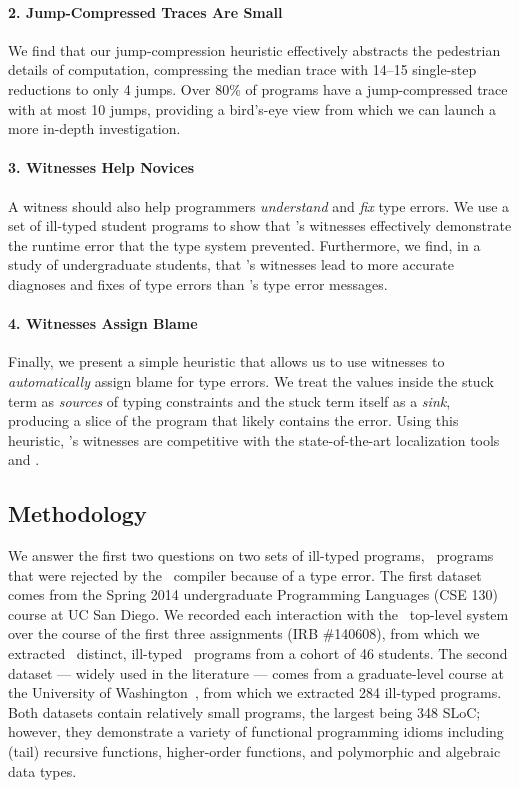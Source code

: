 \paragraph{2. Jump-Compressed Traces Are Small}
We find that our jump-compression heuristic effectively abstracts the
pedestrian details of computation, compressing the median trace with
14--15 single-step reductions to only 4 jumps.
%
Over 80\% of programs have a jump-compressed trace with at most 10
jumps, providing a bird's-eye view from which we can launch a more
in-depth investigation.

\paragraph{3. Witnesses Help Novices}
A witness should also help programmers \emph{understand} and
\emph{fix} type errors.
%
We use a set of ill-typed student programs to show that \toolname's
witnesses effectively demonstrate the runtime error that the type
system prevented.
%
Furthermore, we find, in a study of undergraduate students, that
\toolname's witnesses lead to more accurate diagnoses and fixes of type
errors than \ocaml's type error messages.

\paragraph{4. Witnesses Assign Blame}
Finally, we present a simple heuristic that allows us to use witnesses
to \emph{automatically} assign blame for type errors.
%
We treat the values inside the stuck term as \emph{sources} of typing
constraints and the stuck term itself as a \emph{sink}, producing
a slice of the program that likely contains the error.
%
Using this heuristic, \toolname's witnesses are competitive with the
state-of-the-art localization tools \mycroft and \sherrloc.

\subsection{Methodology}
\label{sec:methodology}
We answer the first two questions on two sets of ill-typed programs,
\ie\ programs that were rejected by the \ocaml\ compiler because of a
type error.
%
The first dataset comes from the Spring 2014 undergraduate Programming
Languages (CSE 130) course at UC San Diego.
%
We recorded each interaction with the \ocaml\ top-level system over the
course of the first three assignments (IRB
\#140608),
from which we extracted \ucsdsize\ distinct, ill-typed \ocaml\ programs
from a cohort of 46 students.
%
The second dataset --- widely used in the literature --- comes from a
graduate-level course at the University of Washington~\cite{Lerner2006-pj},
from which we extracted 284 ill-typed programs.
%
Both datasets contain relatively small programs, the largest being 348
SLoC; however, they demonstrate a variety of functional programming
idioms including (tail) recursive functions, higher-order functions,
and polymorphic and algebraic data types. %

